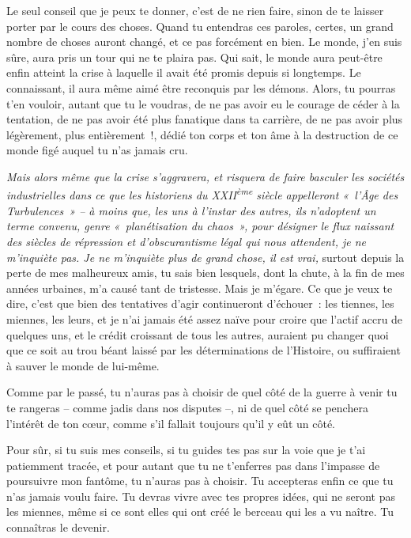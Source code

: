 \documentclass[
  extrafontsizes,
  oneside,
  14pt
]{memoir}
\begin{document}
Le seul conseil que je peux te donner, c'est de ne rien faire, sinon de te
laisser porter par le cours des choses. Quand tu entendras ces paroles, certes,
un grand nombre de choses auront changé, et ce pas forcément en bien. Le monde,
j'en suis sûre, aura pris un tour qui ne te plaira pas. Qui sait, le monde aura
peut-être enfin atteint la crise à laquelle il avait été promis depuis si
longtemps. Le connaissant, il aura même aimé être reconquis par les démons.
Alors, tu pourras t'en vouloir, autant que tu le voudras, de ne pas avoir eu le
courage de céder à la tentation, de ne pas avoir été plus fanatique dans ta
carrière, de ne pas avoir plus légèrement, plus entièrement~!, dédié ton corps
et ton âme à la destruction de ce monde figé auquel tu n'as jamais cru.

\emph{Mais alors même que la crise s'aggravera, et risquera de faire
basculer les sociétés industrielles dans ce que les historiens du
XXII\textsuperscript{ème} siècle appelleront «~l'Âge des Turbulences~» -- à
moins que, les uns à l'instar des autres, ils n'adoptent un terme convenu,
genre «~planétisation du chaos~», pour désigner le flux naissant des siècles de
répression et d'obscurantisme légal qui nous attendent, je ne m'inquiète pas.
Je ne m'inquiète plus de grand chose, il est vrai,} surtout depuis la perte de
mes malheureux amis, tu sais bien lesquels, dont la chute, à la fin de mes
années urbaines, m'a causé tant de tristesse. Mais je m'égare. Ce que je veux
te dire, c'est que bien des tentatives d'agir continueront d'échouer~: les
tiennes, les miennes, les leurs, et je n'ai jamais été assez naïve pour croire
que l'actif accru de quelques uns, et le crédit croissant de tous les autres,
auraient pu changer quoi que ce soit au trou béant laissé par les
déterminations de l'Histoire, ou suffiraient à sauver le monde de lui-même.

Comme par le passé, tu n'auras pas à choisir de quel côté de la guerre à venir
tu te rangeras -- comme jadis dans nos disputes --, ni de quel côté se penchera
l'intérêt de ton cœur, comme s'il fallait toujours qu'il y eût un côté.

Pour sûr, si tu suis mes conseils, si tu guides tes pas sur la voie que je t'ai
patiemment tracée, et pour autant que tu ne t'enferres pas dans l'impasse de
poursuivre mon fantôme, tu n'auras pas à choisir. Tu accepteras enfin ce que tu
n'as jamais voulu faire. Tu devras vivre avec tes propres idées, qui ne seront
pas les miennes, même si ce sont elles qui ont créé le berceau qui les a vu
naître. Tu connaîtras le devenir.
\end{document}
